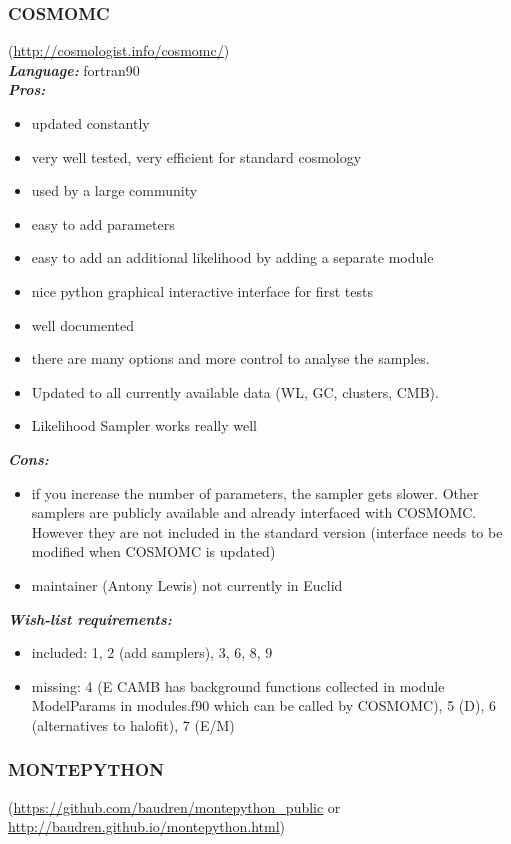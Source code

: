 \newpage
\subsubsection{COSMOMC}
(\url{http://cosmologist.info/cosmomc/})\\

{\it \bf Language:} fortran90\\

{\it \bf Pros:}
\begin{itemize}
 \item updated constantly
 \item very well tested, very efficient for standard cosmology
 \item used by a large community
 \item easy to add parameters
 \item easy to add an additional likelihood by adding a separate module
 \item nice python graphical interactive interface for first tests
 \item well documented
 \item there are many options and more control to analyse the samples. 
 \item Updated to all currently available data (WL, GC, clusters, CMB).
 \item Likelihood Sampler works really well
\end{itemize}

{\it \bf Cons: }
\begin{itemize}
 \item if you increase the number of parameters, the sampler gets slower. Other samplers are publicly available and already interfaced with COSMOMC. However they are not included in the 
 standard version (interface needs to be modified when COSMOMC is updated)
 \item maintainer (Antony Lewis) not currently in Euclid
\end{itemize}

{\it \bf Wish-list requirements: }
\begin{itemize}
 \item included: 1, 2 (add samplers), 3, 6, 8, 9
 \item missing: 4 (E CAMB has background functions collected in module ModelParams in modules.f90 which can be called by COSMOMC), 5 (D), 6 (alternatives to halofit), 7 (E/M)
\end{itemize}

\newpage
\subsubsection{MONTEPYTHON}(\url{https://github.com/baudren/montepython_public} or \url{http://baudren.github.io/montepython.html})\\

